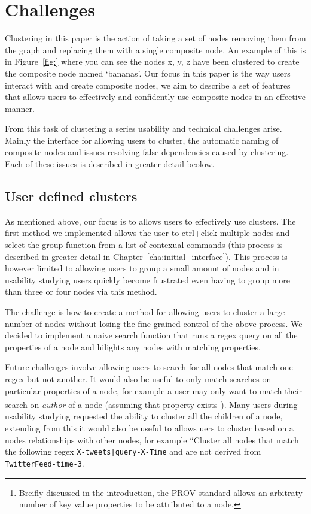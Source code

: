 \chapter{Challenges}


Clustering in this paper is the action of taking a set of nodes removing them from the graph and replacing them with a single composite node. An example of this is in
Figure~\ref{fig:} where you can see the nodes x, y, z have been clustered to create the composite node named `bananas'. Our focus in this paper is the way users interact with and create composite nodes, we aim to describe a set of features that allows users to effectively and confidently use composite nodes in an effective manner.

From this task of clustering a series usability and technical challenges arise. Mainly the interface for allowing users to cluster, the automatic naming of composite nodes and issues resolving false dependencies caused by clustering. Each of these issues is described in greater detail beolow.

\section{User defined clusters}
\label{sec:user_defined_clusters}

As mentioned above, our focus is to allows users to effectively use clusters. The first method we implemented allows the user to ctrl+click multiple nodes and select the group function from a list of contexual commands (this process is described in
greater detail in Chapter~\ref{cha:initial_interface}). This process is however limited to allowing users to group a small amount of nodes and in usability studying users quickly become frustrated even having to group more than three or four nodes via this method.

The challenge is how to create a method for allowing users to cluster a large number of nodes without losing the fine grained control of the above process. We decided to implement a naive search function that runs a regex query on all the properties of a node and hilights any nodes with matching properties.

Future challenges involve allowing users to search for all nodes that match one regex but not another. It would also be useful to only match searches on particular properties of a node, for example a user may only want to match their search on \textit{author} of a node (assuming that property exists\footnote{Breifly discussed in the introduction, the PROV standard allows an arbitraty number of key value properties to be attributed to a node.}). Many users during usability studying requested the ability to cluster all the children of a node, extending from this it would also be useful to allows uers to cluster based on a nodes relationships with other nodes, for example ``Cluster all nodes that match the following regex \texttt{X-tweets|query-X-Time} and are not derived from \texttt{TwitterFeed-time-3}.

